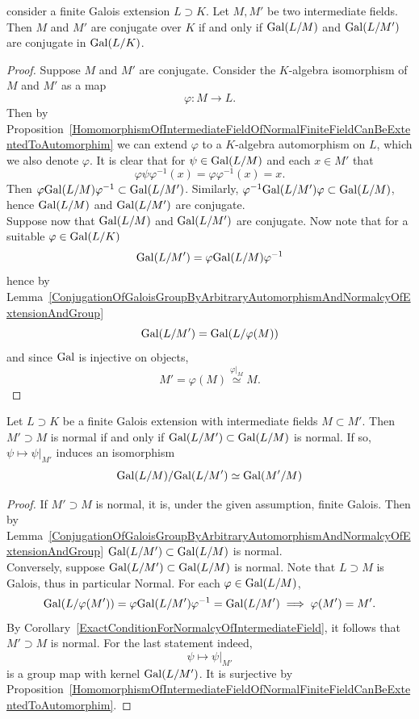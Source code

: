 \begin{lemma}
    consider a finite Galois extension $L\supset K$. Let $M,M'$ be two intermediate fields. Then $M$ and $M'$ are conjugate over $K$ if and only if $\mathrm{Gal}(L/M)$ and $\mathrm{Gal}(L/M')$ are conjugate in $\mathrm{Gal}(L/K)$. 
\end{lemma}
\begin{proof}
    Suppose $M$ and $M'$ are conjugate. Consider the $K$-algebra isomorphism of $M$ and $M'$ as a map
    $$
        \varphi: M\rightarrow L.
    $$
    Then by Proposition~\ref{HomomorphismOfIntermediateFieldOfNormalFiniteFieldCanBeExtentedToAutomorphim} we can extend $\varphi$ to a $K$-algebra automorphism on $L$, which we also denote $\varphi$. It is clear that for $\psi\in \mathrm{Gal}(L/M)$ and each $x\in M'$ that 
    $$
        \varphi \psi \varphi^{-1}(x) = \varphi\varphi^{-1}(x)=x.
    $$
    Then $\varphi \mathrm{Gal}(L/M)\varphi^{-1}\subset \mathrm{Gal}(L/M')$. Similarly, $\varphi^{-1}\mathrm{Gal}(L/M')\varphi \subset \mathrm{Gal}(L/M)$, hence $\mathrm{Gal}(L/M)$ and $\mathrm{Gal}(L/M')$ are conjugate.\\
    Suppose now that $\mathrm{Gal}(L/M)$ and $\mathrm{Gal}(L/M')$ are conjugate. Now note that for a suitable $\varphi\in \mathrm{Gal}(L/K) $
    $$
        \mathrm{Gal}(L/M') = \varphi\mathrm{Gal}(L/M) \varphi^{-1}
    $$
    hence by Lemma~\ref{ConjugationOfGaloisGroupByArbitraryAutomorphismAndNormalcyOfExtensionAndGroup}
    $$
        \mathrm{Gal}(L/M') = \mathrm{Gal}(L/\varphi(M))
    $$
    and since $\mathrm{Gal}$ is injective on objects,
    $$
        M' = \varphi(M)\overset{\left.\varphi\right|_M}\simeq M . 
    $$
\end{proof}
\begin{lemma}
    Let $L\supset K$ be a finite Galois extension with intermediate fields $M\subset M'$. Then $M'\supset M$ is normal if and only if $\mathrm{Gal}(L/M')\subset \mathrm{Gal}(L/M)$ is normal. If so, $\psi\mapsto \left.\psi\right|_{M'}$ induces an isomorphism 
    $$
        \mathrm{Gal}(L/M)/\mathrm{Gal}(L/M')\simeq \mathrm{Gal}(M'/M)
    $$ 
\end{lemma}
\begin{proof}
    If $M'\supset M$ is normal, it is, under the given assumption, finite Galois. Then by Lemma~\ref{ConjugationOfGaloisGroupByArbitraryAutomorphismAndNormalcyOfExtensionAndGroup} $\mathrm{Gal}(L/M')\subset \mathrm{Gal}(L/M)$ is normal.\\
    Conversely, suppose $\mathrm{Gal}(L/M')\subset \mathrm{Gal}(L/M)$ is normal. Note that $L\supset  M$ is Galois, thus in particular Normal. For each $\varphi\in \mathrm{Gal}(L/M)$,
    $$
        \mathrm{Gal}(L/\varphi(M'))=\varphi\mathrm{Gal}(L/M')\varphi^{-1}=\mathrm{Gal}(L/M') \implies \varphi(M')=M'.
    $$  
    By Corollary~\ref{ExactConditionForNormalcyOfIntermediateField}, it follows that $M'\supset M$ is normal. For the last statement indeed, 
    $$
        \psi\mapsto \left.\psi\right|_{M'}
    $$
    is a group map with kernel $\mathrm{Gal}(L/M')$. It is surjective by Proposition~\ref{HomomorphismOfIntermediateFieldOfNormalFiniteFieldCanBeExtentedToAutomorphim}.
\end{proof}
